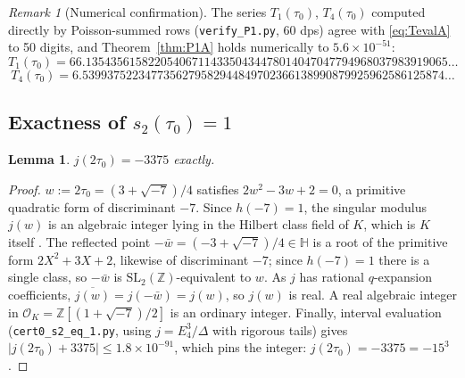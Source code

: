 \documentclass[11pt]{article}
\newtheorem{lemma}[theorem]{Lemma}
\theoremstyle{definition}
\theoremstyle{remark}
\newtheorem{remark}[theorem]{Remark}
\newcommand{\Hh}{\mathbb{H}}
\newcommand{\Zz}{\mathbb{Z}}
\newcommand{\OO}{\mathcal{O}}
\begin{document}
\begin{remark}[Numerical confirmation]
The series $T_1(\tau_0)$, $T_4(\tau_0)$ computed directly by Poisson-summed
rows (\texttt{verify\_P1.py}, 60 dps) agree with \eqref{eq:TevalA} to 50
digits, and Theorem~\ref{thm:P1A} holds numerically to $5.6\times10^{-51}$:
\[
  T_1(\tau_0)=66.1354356158220540671143350434478014047047794968037983919065\ldots
\]
\[
  T_4(\tau_0)=6.5399375223477356279582944849702366138990879925962586125874\ldots
\]
\end{remark}

\subsection{Exactness of \texorpdfstring{$s_2(\tau_0)=1$}{s2(tau0)=1}}\label{subsec:exactA}

\begin{lemma}\label{lem:jvalA}
$j(2\tau_0)=-3375$ exactly.
\end{lemma}
\begin{proof}
$w:=2\tau_0=(3+\sqrt{-7})/4$ satisfies $2w^2-3w+2=0$, a primitive quadratic
form of discriminant $-7$. Since $h(-7)=1$, the singular modulus $j(w)$ is
an algebraic integer lying in the Hilbert class field of $K$, which is $K$
itself \cite{Cox}. The reflected point $-\bar w=(-3+\sqrt{-7})/4\in\Hh$
is a root of the primitive form $2X^2+3X+2$, likewise of discriminant
$-7$; since $h(-7)=1$ there is a single class, so $-\bar w$ is
$\mathrm{SL}_2(\Zz)$-equivalent to $w$. As $j$ has rational
$q$-expansion coefficients,
$\overline{j(w)}=j(-\bar w)=j(w)$, so $j(w)$ is real. A real algebraic
integer in $\OO_K=\Zz[(1+\sqrt{-7})/2]$ is an ordinary integer. Finally,
interval evaluation (\texttt{cert0\_s2\_eq\_1.py}, using
$j=E_4^3/\Delta$ with rigorous tails) gives $|j(2\tau_0)+3375|\le
1.8\times10^{-91}$,
which pins the integer: $j(2\tau_0)=-3375=-15^3$.
\end{proof}
\end{document}
